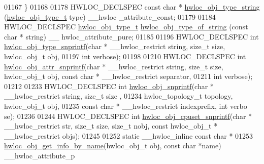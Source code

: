 \begin{DoxyCode}
01167 \}
01168 
01178 HWLOC\_DECLSPEC \textcolor{keyword}{const} \textcolor{keywordtype}{char} * \hyperlink{a00048_ga7c61920feca6fd9006d930dabfc09058}{hwloc_obj_type_string} (\hyperlink{a00041_gacd37bb612667dc437d66bfb175a8dc55}{hwloc_obj_type_t} type) \_\_hwloc
      \_attribute\_const;
01179 
01184 HWLOC\_DECLSPEC \hyperlink{a00041_gacd37bb612667dc437d66bfb175a8dc55}{hwloc_obj_type_t} \hyperlink{a00048_gade722091ae392fdc79557e797a16c370}{hwloc_obj_type_of_string} (\textcolor{keyword}{const} \textcolor{keywordtype}{char} * \textcolor{keywordtype}{string}) \_\_
      hwloc\_attribute\_pure;
01185 
01196 HWLOC\_DECLSPEC \textcolor{keywordtype}{int} \hyperlink{a00048_ga3ad856e8f3487d340c82a23b8a2a0351}{hwloc_obj_type_snprintf}(\textcolor{keywordtype}{char} * \_\_hwloc\_restrict \textcolor{keywordtype}{string}, \textcolor{keywordtype}{size\_t
      } size, hwloc\_obj\_t obj,
01197                                    \textcolor{keywordtype}{int} verbose);
01198 
01210 HWLOC\_DECLSPEC \textcolor{keywordtype}{int} \hyperlink{a00048_ga0db8286d7f3ceda8defd76e3e1e2b284}{hwloc_obj_attr_snprintf}(\textcolor{keywordtype}{char} * \_\_hwloc\_restrict \textcolor{keywordtype}{string}, \textcolor{keywordtype}{size\_t
      } size, hwloc\_obj\_t obj, \textcolor{keyword}{const} \textcolor{keywordtype}{char} * \_\_hwloc\_restrict separator,
01211                                    \textcolor{keywordtype}{int} verbose);
01212 
01233 HWLOC\_DECLSPEC \textcolor{keywordtype}{int} \hyperlink{a00048_ga5c6a61a83f4790b421e2f62e9088446f}{hwloc_obj_snprintf}(\textcolor{keywordtype}{char} * \_\_hwloc\_restrict \textcolor{keywordtype}{string}, \textcolor{keywordtype}{size\_t} size
      ,
01234                              hwloc\_topology\_t topology, hwloc\_obj\_t obj,
01235                              \textcolor{keyword}{const} \textcolor{keywordtype}{char} * \_\_hwloc\_restrict indexprefix, \textcolor{keywordtype}{int} verbo
      se);
01236 
01244 HWLOC\_DECLSPEC \textcolor{keywordtype}{int} \hyperlink{a00048_gabbfb92224c992c0e2ecef6b6e45260f2}{hwloc_obj_cpuset_snprintf}(\textcolor{keywordtype}{char} * \_\_hwloc\_restrict str, \textcolor{keywordtype}{size\_t} 
      size, \textcolor{keywordtype}{size\_t} nobj, \textcolor{keyword}{const} hwloc\_obj\_t * \_\_hwloc\_restrict objs);
01245 
01252 \textcolor{keyword}{static} \_\_hwloc\_inline \textcolor{keyword}{const} \textcolor{keywordtype}{char} *
01253 \hyperlink{a00048_ga2a12b2450489675bd5759dc47cbc51ed}{hwloc_obj_get_info_by_name}(hwloc\_obj\_t obj, \textcolor{keyword}{const} \textcolor{keywordtype}{char} *name) \_\_hwloc\_attribute\_p

\end{DoxyCode}
